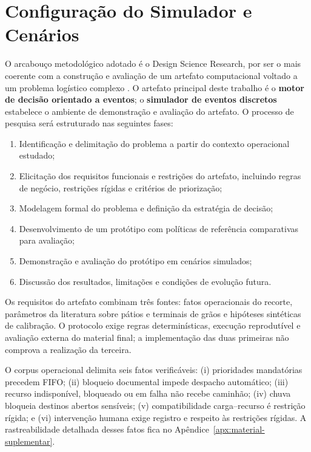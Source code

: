 \documentclass[
  12pt,
  oneside,
  a4paper,
  sumario=tradicional,
  brazil
]{abntex2}
\begin{document}
\section{Configuração do Simulador e Cenários}
O arcabou\c{c}o metodol\'ogico adotado \'e o Design Science Research, por ser o mais coerente com a constru\c{c}\~ao e avalia\c{c}\~ao de um artefato computacional voltado a um problema log\'istico complexo \parencite{hevnerDesignScienceInformation2004a, peffersDesignScienceResearch2007aa}. O artefato principal deste trabalho \'e o \textbf{motor de decis\~ao orientado a eventos}; o \textbf{simulador de eventos discretos} estabelece o ambiente de demonstra\c{c}\~ao e avalia\c{c}\~ao do artefato. O processo de pesquisa ser\'a estruturado nas seguintes fases:
\begin{enumerate}[leftmargin=1.27cm,itemsep=0pt,topsep=0pt,parsep=0pt,partopsep=0pt]
  \item Identifica\c{c}\~ao e delimita\c{c}\~ao do problema a partir do contexto operacional estudado;
  \item Elicita\c{c}\~ao dos requisitos funcionais e restri\c{c}\~oes do artefato, incluindo regras de neg\'ocio, restri\c{c}\~oes r\'igidas e crit\'erios de prioriza\c{c}\~ao;
  \item Modelagem formal do problema e defini\c{c}\~ao da estrat\'egia de decis\~ao;
  \item Desenvolvimento de um prot\'otipo com pol\'iticas de refer\^encia comparativas para avalia\c{c}\~ao;
  \item Demonstra\c{c}\~ao e avalia\c{c}\~ao do prot\'otipo em cen\'arios simulados;
  \item Discuss\~ao dos resultados, limita\c{c}\~oes e condi\c{c}\~oes de evolu\c{c}\~ao futura.
\end{enumerate}

Os requisitos do artefato combinam tr\^es fontes: fatos operacionais do recorte, par\^ametros da literatura sobre p\'atios e terminais de gr\~aos e hip\'oteses sint\'eticas de calibra\c{c}\~ao. O protocolo exige regras determin\'isticas, execu\c{c}\~ao reprodut\'ivel e avalia\c{c}\~ao externa do material final; a implementa\c{c}\~ao das duas primeiras n\~ao comprova a realiza\c{c}\~ao da terceira.

O corpus operacional delimita seis fatos verific\'aveis: (i) prioridades mandat\'orias precedem FIFO; (ii) bloqueio documental impede despacho autom\'atico; (iii) recurso indispon\'ivel, bloqueado ou em falha n\~ao recebe caminh\~ao; (iv) chuva bloqueia destinos abertos sens\'iveis; (v) compatibilidade carga--recurso \'e restri\c{c}\~ao r\'igida; e (vi) interven\c{c}\~ao humana exige registro e respeito \`as restri\c{c}\~oes r\'igidas. A rastreabilidade detalhada desses fatos fica no Ap\^endice~\ref{apx:material-suplementar}.
\end{document}
